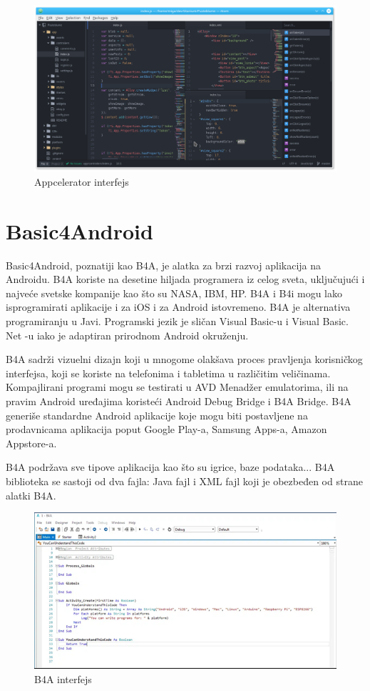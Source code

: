 \documentclass[12pt]{article}
\begin{document}
\begin{figure}[ht!]
    \centering
    \includegraphics[scale=0.3]{Appcelerator.png}
    \caption{Appcelerator interfejs}
\end{figure}

\section{Basic4Android}
Basic4Android, poznatiji kao B4A, je alatka za brzi razvoj aplikacija na Androidu. B4A koriste na desetine hiljada programera iz celog sveta, uključujući i najveće svetske kompanije kao što su NASA, IBM, HP.
B4A i B4i mogu lako isprogramirati aplikacije i za iOS i za Android istovremeno. B4A je alternativa programiranju u Javi. Programski jezik je sličan Visual Basic-u i Visual Basic. Net -u iako je adaptiran prirodnom Android okruženju.

B4A sadrži vizuelni dizajn koji u mnogome olakšava proces pravljenja korisničkog interfejsa, koji se koriste na telefonima i tabletima u različitim veličinama. Kompajlirani programi mogu se testirati u AVD Menadžer emulatorima, ili na pravim Android uređajima koristeći Android Debug Bridge i B4A Bridge. 
B4A generiše standardne Android aplikacije koje mogu biti postavljene na prodavnicama aplikacija poput Google Play-a, Samsung Apps-a, Amazon Appstore-a.

B4A podržava sve tipove aplikacija kao što su igrice, baze podataka... B4A biblioteka se sastoji od dva fajla: Java fajl i XML fajl koji je obezbeđen od strane alatki B4A.

\begin{figure}[ht!]
    \centering
    \includegraphics[scale=0.9]{b4aslika.png}
    \caption{B4A interfejs}
\end{figure}
\end{document}
